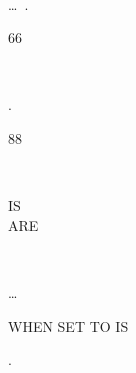 \begin{syntax}
\begin{0-1}
     \\

    \begin{1=}
       \\
       \\
    \end{1=}
    \begin{0-1}
       \\
    \end{0-1} \\

     \\

  \end{0-1}\ldots\ {}.
\end{syntax}

\begin{syntax}
  66 \identifier {} \identifier
  \begin{0-1}
    \begin{1=}
       \\
    \end{1=}
    \identifier
  \end{0-1}.
\end{syntax}

\begin{syntax}
  88 \identifier
  \begin{1=}
     \\
  \end{1=}
  \begin{0-1}
    IS \\
    ARE
  \end{0-1}
  \begin{1=}
    \literal
    \begin{0-1}
      \begin{1=}
         \\
      \end{1=}
      \literal
    \end{0-1}
  \end{1=} \ldots

  \begin{0-1}
    WHEN SET TO  IS \literal
  \end{0-1}.
\end{syntax}

